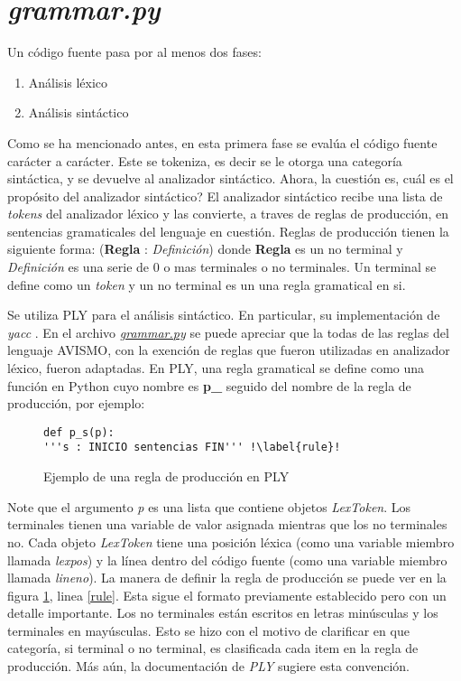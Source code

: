 \section{\textit{grammar.py}}
Un código fuente pasa por al menos dos fases:
\begin{enumerate}
	\item Análisis léxico
	\item Análisis sintáctico
\end{enumerate}

Como se ha mencionado antes, en esta primera fase se evalúa el código fuente carácter a carácter.
Este se tokeniza, es decir se le otorga una categoría sintáctica, y se devuelve al analizador sintáctico.
Ahora, la cuestión es, cuál es el propósito del analizador sintáctico?
El analizador sintáctico recibe una lista de \textit{tokens} del analizador léxico y las convierte, a traves de reglas de producción, en sentencias gramaticales del lenguaje en cuestión.
Reglas de producción tienen la siguiente forma: (\textbf{Regla} : \textit{Definición}) donde \textbf{Regla} es un no terminal y \textit{Definición} es una serie de 0 o mas terminales o no terminales.
Un terminal se define como un \textit{token} y un no terminal es un una regla gramatical en si.

Se utiliza PLY \cite{noauthor_ply_nodate} para el análisis sintáctico. En particular, su implementación de \textit{yacc} \cite{noauthor_man_nodate}.
En el archivo \href{https://github.com/aramis-matos/comp4999_compilers_project/blob/master/code/python_remake/grammar.py}{\textit{grammar.py}} se puede apreciar que la todas de las reglas del lenguaje AVISMO, con la exención de reglas que fueron utilizadas en analizador léxico, fueron adaptadas.
En PLY, una regla gramatical se define como una función en Python cuyo nombre es \textbf{p\_} seguido del nombre de la regla de producción, por ejemplo:
\begin{figure}[H]
	\begin{verbatim}
def p_s(p):
'''s : INICIO sentencias FIN''' !\label{rule}!
	\end{verbatim}
	\caption{Ejemplo de una regla de producción en PLY}
	\label{fig: grammarRuleExample}
\end{figure}
Note que el argumento \textit{p} es una lista que contiene objetos \textit{LexToken}.
Los terminales tienen una variable de valor asignada mientras que los no terminales no.
Cada objeto \textit{LexToken} tiene una posición léxica (como una variable miembro llamada \textit{lexpos}) y la línea dentro del código fuente  (como una variable miembro llamada \textit{lineno}).
La manera de definir la regla de producción se puede ver en la figura \ref{fig: grammarRuleExample}, linea \ref{rule}.
Esta sigue el formato previamente establecido pero con un detalle importante.
Los no terminales están escritos en letras minúsculas y los terminales en mayúsculas.
Esto se hizo con el motivo de clarificar en que categoría, si terminal o no terminal, es clasificada cada item en la regla de producción.
Más aún, la documentación de \textit{PLY} sugiere esta convención.

